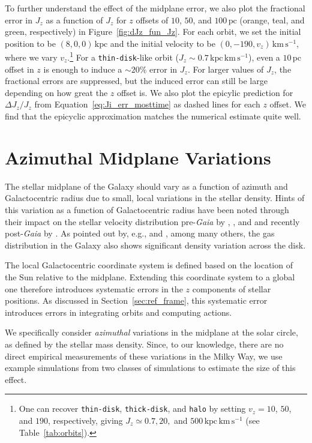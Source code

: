\documentclass[twocolumn]{aastex62}
\newcommand{\pc}{\text{pc}}
\newcommand{\kpc}{\text{kpc}}
\newcommand{\kms}{\text{km}\,\text{s}^{-1}}
\newcommand{\actunit}{\text{kpc}\,\kms}
\newcommand{\thin}{\texttt{thin-disk}}
\newcommand{\thick}{\texttt{thick-disk}}
\newcommand{\halo}{\texttt{halo}}
\begin{document}
To further understand the effect of the midplane error, we also plot the
fractional error in $J_z$ as a function of $J_z$ for $z$ offsets of $10$, $50$, and $
100\,\pc$ (orange, teal, and green, respectively) in
Figure~\ref{fig:dJz_fun_Jz}. 
For each orbit, we set the initial position to be
$(8,0,0)\,\kpc$ and the initial velocity to be $(0, -190, v_z)\,\kms$, where
we vary $v_z$.\footnote{\label{note:vz_orbits}One can recover \thin{},
\thick{}, and \halo{} by setting $v_z=10$, $50$, and $190$,
 respectively, 
giving $J_z \simeq 0.7, 20,$ and $500\,\actunit$
(see Table~\ref{tab:orbits}).} For a \thin{}-like orbit ($J_z\sim0.7\,\actunit$), 
even a
$10\,\pc$ offset in $z$ is enough to induce a 
$\sim20\%$ 
error in $J_z$. For
larger values of $J_z$, the fractional errors are suppressed, but the induced
error can still be large depending on how great the $z$ offset is. We also
plot the epicylic prediction for $\Delta J_z / J_z$ from
Equation~\eqref{eq:Ji_err_mosttime} as dashed lines for each $z$ offset. We
find that the epicyclic approximation matches the numerical estimate quite
well.

\section{
Azimuthal Midplane Variations}
\label{sec:local_fire}

The stellar midplane of the Galaxy should vary as a function of azimuth and
Galactocentric radius due to small, local variations in the stellar density.
Hints of this variation as a function of Galactocentric radius have been noted
through their impact on the stellar velocity distribution pre-\textit{Gaia} by
\citet{2012ApJ...750L..41W}, \citet{2013ApJ...777L...5C}, and
\citet{2013MNRAS.436..101W} and recently post-\textit{Gaia} by
\citet{2019arXiv190209569F}. As pointed out by, e.g.,
\citet{2014ApJ...797...53G} and \citet{2019ApJ...871..145A}, among many
others, the gas distribution in the Galaxy also shows significant density
variation across the disk.

The local Galactocentric coordinate system is defined based on the location of
the Sun relative to the midplane. Extending this coordinate system to a global
one therefore introduces systematic errors in the $z$ components of stellar
positions. As discussed in Section~\ref{sec:ref_frame}, this systematic error
introduces errors in integrating orbits and computing actions.

We specifically consider \emph{azimuthal} variations in the midplane at the solar circle, as defined by the stellar mass density. Since, to our knowledge, there are no direct empirical measurements of these variations in the Milky Way, we use example simulations from two classes of simulations to estimate the size of this effect.
\end{document}
